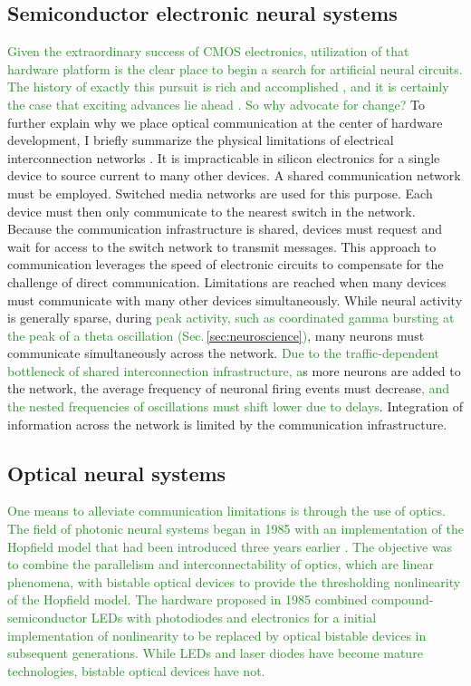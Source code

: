 \documentclass{article}
\begin{document}
\begin{multicols}{2}
\subsection{Semiconductor electronic neural systems}
\textcolor{ForestGreen}{Given the extraordinary success of CMOS electronics, utilization of that hardware platform is the clear place to begin a search for artificial neural circuits. The history of exactly this pursuit is rich \cite{me1989,me1990,lide2015} and accomplished \cite{voma2007,inli2011,chst2014,aast2018,boro2018}, and it is certainly the case that exciting advances lie ahead \cite{stin2019}. So why advocate for change?} To further explain why we place optical communication at the center of hardware development, I briefly summarize the physical limitations of electrical interconnection networks \cite{hepa2012}. It is impracticable in silicon electronics for a single device to source current to many other devices. A shared communication network must be employed. Switched media networks are used for this purpose. Each device must then only communicate to the nearest switch in the network. Because the communication infrastructure is shared, devices must request and wait for access to the switch network to transmit messages. This approach to communication leverages the speed of electronic circuits to compensate for the challenge of direct communication. Limitations are reached when many devices must communicate with many other devices simultaneously. While neural activity is generally sparse, during \textcolor{ForestGreen}{peak activity, such as coordinated gamma bursting at the peak of a theta oscillation (Sec.\,\ref{sec:neuroscience})}, many neurons must communicate simultaneously across the network. \textcolor{ForestGreen}{Due to the traffic-dependent bottleneck of shared interconnection infrastructure, a}s more neurons are added to the network, the average frequency of neuronal firing events must decrease\textcolor{ForestGreen}{, and the nested frequencies of oscillations must shift lower due to delays}. Integration of information across the network is limited by the communication infrastructure.

\subsection{Optical neural systems}
\textcolor{ForestGreen}{One means to alleviate communication limitations is through the use of optics. The field of photonic neural systems began in 1985 \cite{psfa1985,faps1985} with an implementation of the Hopfield model that had been introduced three years earlier \cite{ho1982}. The objective was to combine the parallelism and interconnectability of optics, which are linear phenomena, with bistable optical devices to provide the thresholding nonlinearity of the Hopfield model. The hardware proposed in 1985 combined compound-semiconductor LEDs with photodiodes and electronics for a initial implementation of nonlinearity to be replaced by optical bistable devices in subsequent generations. While LEDs and laser diodes have become mature technologies, bistable optical devices have not.}


\end{multicols}
\end{document}
